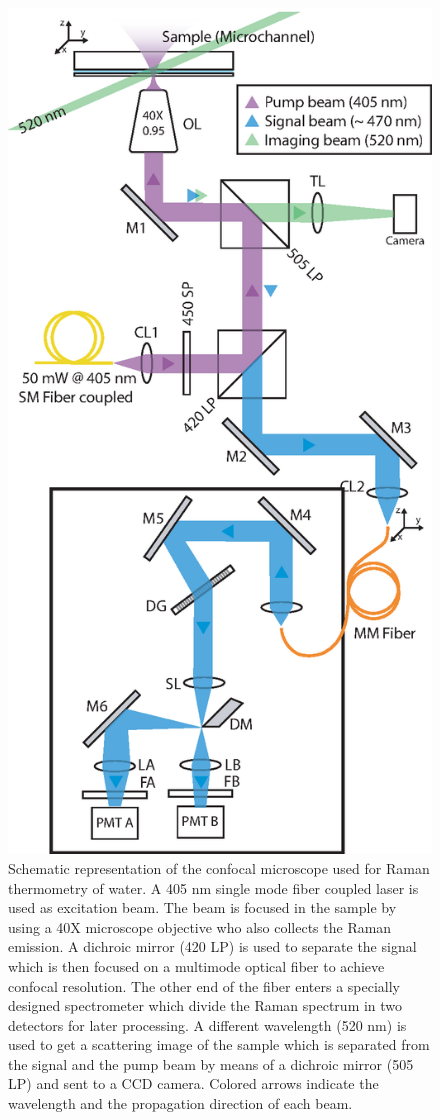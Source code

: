 \documentclass[twocolumn]{svjour3}       %
\begin{document}
\begin{figure}[h!]\label{fig:setup}
\centering
\includegraphics[width=\columnwidth]{figs/setup.eps}
\caption{Schematic representation of the confocal microscope used for Raman thermometry of water. A 405 nm single mode fiber coupled laser is used as excitation beam. The beam is focused in the sample by using a 40X microscope objective who also collects the Raman emission. A dichroic mirror (420 LP) is used to separate the signal which is then focused on a multimode optical fiber to achieve confocal resolution. The other end of the fiber enters a specially designed spectrometer which divide the Raman spectrum in two detectors for later processing. A different wavelength (520 nm) is used to get a scattering image of the sample which is separated from the signal and the pump beam by means of a dichroic mirror (505 LP) and sent to a CCD camera. Colored arrows indicate the wavelength and the propagation direction of each beam.}

\end{figure}
\end{document}
